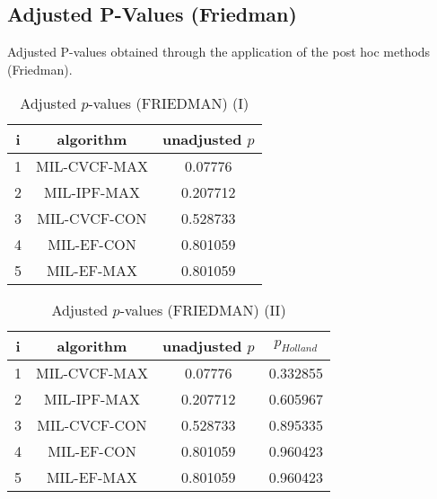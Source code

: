 \documentclass[a4paper,10pt]{article}
\begin{document}
\begin{landscape}
\newpage

\section{Adjusted P-Values (Friedman)}


Adjusted P-values obtained through the application of the post hoc methods (Friedman).

\begin{table}[!htp]
\centering\small
\begin{tabular}{ccc}
i&algorithm&unadjusted $p$\\
\hline1&MIL-CVCF-MAX&0.07776\\2&MIL-IPF-MAX&0.207712\\3&MIL-CVCF-CON&0.528733\\4&MIL-EF-CON&0.801059\\5&MIL-EF-MAX&0.801059\\\hline
\end{tabular}
\caption{Adjusted $p$-values (FRIEDMAN) (I)}
\end{table}
\begin{table}[!htp]
\centering\small
\begin{tabular}{cccc}
i&algorithm&unadjusted $p$&$p_{Holland}$\\
\hline1&MIL-CVCF-MAX&0.07776&0.332855\\2&MIL-IPF-MAX&0.207712&0.605967\\3&MIL-CVCF-CON&0.528733&0.895335\\4&MIL-EF-CON&0.801059&0.960423\\5&MIL-EF-MAX&0.801059&0.960423\\\hline
\end{tabular}
\caption{Adjusted $p$-values (FRIEDMAN) (II)}
\end{table}

\newpage
\end{landscape}
\end{document}
